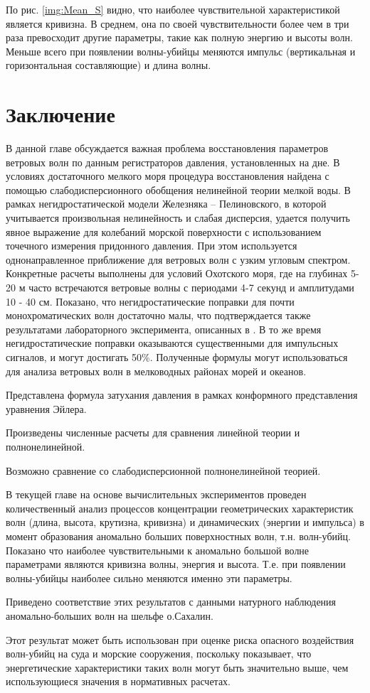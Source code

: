По рис. \ref{img:Mean_S} видно, что наиболее чувствительной характеристикой является кривизна. В среднем, она по своей чувствительности более чем в три раза превосходит другие параметры, такие как полную энергию и высоты волн. Меньше всего при появлении волны-убийцы меняются импульс (вертикальная и горизонтальная составляющие) и длина волны.




\section{Заключение} \label{sect3_0}
В данной главе обсуждается важная проблема восстановления параметров  ветровых волн по данным регистраторов давления, установленных на дне. В условиях достаточного мелкого моря процедура восстановления найдена с помощью слабодисперсионного обобщения нелинейной теории мелкой воды. В рамках негидростатической модели Железняка – Пелиновского, в которой учитывается произвольная нелинейность и слабая дисперсия, удается получить явное выражение для колебаний морской поверхности с использованием точечного измерения придонного давления. При этом используется однонаправленное приближение для ветровых волн с узким угловым спектром. Конкретные расчеты выполнены для условий Охотского моря, где на глубинах 5-20 м часто встречаются ветровые волны с периодами 4-7 секунд и амплитудами 10 - 40 см. Показано, что негидростатические поправки для почти монохроматических волн достаточно малы, что подтверждается также результатами лабораторного эксперимента, описанных в  \cite{Oliveras_2012}. В то же время негидростатические поправки оказываются существенными для импульсных сигналов, и могут достигать 50\%. Полученные формулы могут использоваться для анализа ветровых волн в мелководных районах морей и океанов.

Представлена формула затухания давления в рамках конформного представления уравнения Эйлера.

Произведены численные расчеты для сравнения линейной теории и полнонелинейной.

Возможно сравнение со слабодисперсионной полнонелинейной теорией.

В текущей главе на основе вычислительных экспериментов проведен количественный анализ процессов концентрации геометрических характеристик волн (длина, высота, крутизна, кривизна) и динамических (энергии и импульса) в момент образования аномально больших поверхностных волн, т.н. волн-убийц. Показано что наиболее чувствительными к аномально большой волне параметрами являются кривизна волны, энергия и высота. Т.е. при появлении волны-убийцы наиболее сильно меняются именно эти параметры.

Приведено соответствие этих результатов с данными натурного наблюдения аномально-больших волн на шельфе о.Сахалин.

Этот результат может быть использован при оценке риска опасного воздействия волн-убийц на суда и морские сооружения, поскольку показывает, что энергетические характеристики таких волн могут быть значительно выше, чем использующиеся значения в нормативных расчетах.



\clearpage
